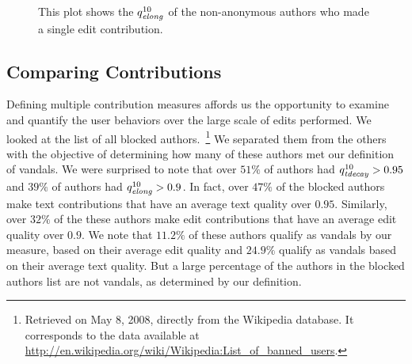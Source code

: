 \begin{figure}[tbph]
    \begin{center}
    \end{center}
    \caption[Edit quality of authors with one edit]{
        This plot shows the $\quality{elong}{10}{}$ of the
	non-anonymous authors who made a single edit contribution.
    }
    \label{fig-singles-quality}
\end{figure}






\subsection{Comparing Contributions}

Defining multiple contribution measures affords us
the opportunity to examine and quantify the
user behaviors over the large scale of edits performed.
We looked at the list of all blocked authors.~\footnote{Retrieved
on May 8, 2008, directly from the Wikipedia database.
It corresponds to the data available at
\url{http://en.wikipedia.org/wiki/Wikipedia:List_of_banned_users}.}
We separated them from the others with the objective of determining 
how many of these authors met our definition of vandals.
We were surprised to note that over $51\%$ of authors had 
$\quality{tdecay}{10}{} > 0.95$ and $39\%$ of authors had 
$\quality{elong}{10}{} > 0.9$.
In fact, over $47\%$ of the blocked authors make text contributions 
that have an average text quality over $0.95$.
Similarly, over $32\%$ of the these authors make edit contributions
that have an average edit quality over $0.9$.
We note that $11.2\%$ of these authors qualify as vandals by our measure,
based on their average edit quality and $24.9\%$ qualify as vandals
based on their average text quality.
But a large percentage of the authors in the blocked authors 
list are not vandals, as determined by our definition.

